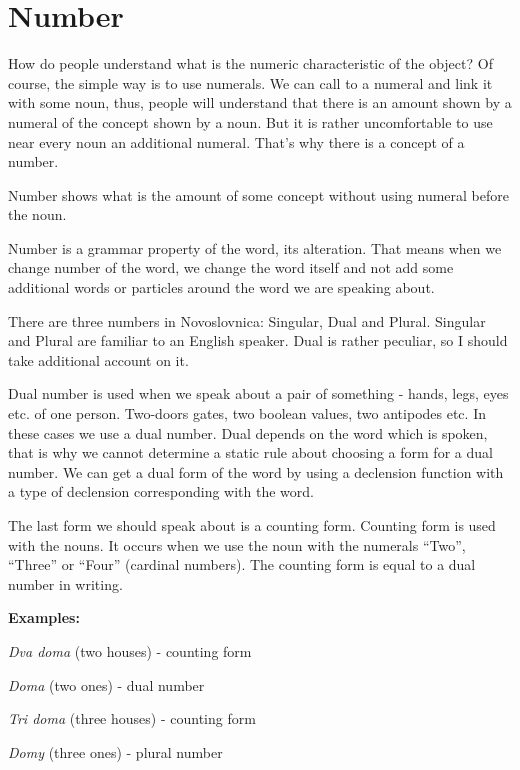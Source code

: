 \section{Number}

How do people understand what is the numeric characteristic of the object? Of course, the simple way is to use numerals. We can call to a numeral and link it with some noun, thus, people will understand that there is an amount shown by a numeral of the concept shown by a noun. But it is rather uncomfortable to use near every noun an additional numeral. That’s why there is a concept of a number.

Number shows what is the amount of some concept without using numeral before the noun.

Number is a grammar property of the word, its alteration. That means when we change number of the word, we change the word itself and not add some additional words or particles around the word we are speaking about.

There are three numbers in Novoslovnica: Singular, Dual and Plural. Singular and Plural are familiar to an English speaker. Dual is rather peculiar, so I should take additional account on it.

Dual number is used when we speak about a pair of something - hands, legs, eyes etc. of one person. Two-doors gates, two boolean values, two antipodes etc. In these cases we use a dual number. Dual depends on the word which is spoken, that is why we cannot determine a static rule about choosing a form for a dual number. We can get a dual form of the word by using a declension function with a type of declension corresponding with the word.

The last form we should speak about is a counting form. Counting form is used with the nouns. It occurs when we use the noun with the numerals “Two”, “Three” or “Four” (cardinal numbers). The counting form is equal to a dual number in writing. 

\textbf{Examples:}

\textit{Dva doma} (two houses) - counting form

\textit{Doma} (two ones) - dual number

\textit{Tri doma} (three houses) - counting form

\textit{Domy} (three ones) - plural number 
